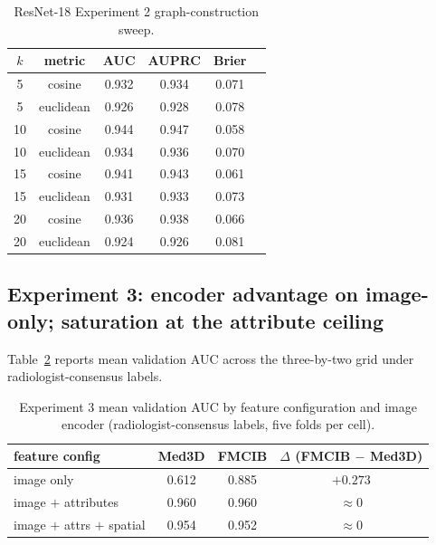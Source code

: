 \documentclass[10pt,letterpaper,twocolumn]{article}
\begin{document}
\begin{table}[t]
\centering
\caption{ResNet-18 Experiment 2 graph-construction sweep.}
\label{tab:resnet18-exp2}
\small
\begin{tabular}{cccccc}
\toprule
$k$ & metric & AUC & AUPRC & Brier \\
\midrule
5  & cosine    & 0.932 & 0.934 & 0.071 \\
5  & euclidean & 0.926 & 0.928 & 0.078 \\
10 & cosine    & 0.944 & 0.947 & 0.058 \\
10 & euclidean & 0.934 & 0.936 & 0.070 \\
15 & cosine    & 0.941 & 0.943 & 0.061 \\
15 & euclidean & 0.931 & 0.933 & 0.073 \\
20 & cosine    & 0.936 & 0.938 & 0.066 \\
20 & euclidean & 0.924 & 0.926 & 0.081 \\
\bottomrule
\end{tabular}
\end{table}

\subsection{Experiment 3: encoder advantage on image-only; saturation at the attribute ceiling}
\label{sec:results-exp3}

Table~\ref{tab:exp3} reports mean validation AUC across the three-by-two grid under radiologist-consensus labels.

\begin{table}[t]
\centering
\caption{Experiment 3 mean validation AUC by feature configuration and image encoder (radiologist-consensus labels, five folds per cell).}
\label{tab:exp3}
\small
\begin{tabular}{lccc}
\toprule
feature config & Med3D & FMCIB & $\Delta$ (FMCIB $-$ Med3D) \\
\midrule
image only                  & 0.612 & 0.885 & $+0.273$ \\
image $+$ attributes        & 0.960 & 0.960 & $\approx 0$ \\
image $+$ attrs $+$ spatial & 0.954 & 0.952 & $\approx 0$ \\
\bottomrule
\end{tabular}
\end{table}
\end{document}
